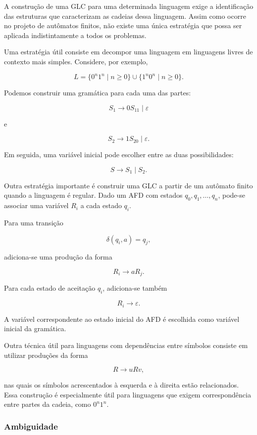 \documentclass[
  brazilian,
  letterpaper,
]{book}
\theoremstyle{plain}
\theoremstyle{definition}
\theoremstyle{remark}
\begin{document}
A construção de uma GLC para uma determinada linguagem exige a
identificação das estruturas que caracterizam as cadeias dessa
linguagem. Assim como ocorre no projeto de autômatos finitos, não existe
uma única estratégia que possa ser aplicada indistintamente a todos os
problemas.

Uma estratégia útil consiste em decompor uma linguagem em linguagens
livres de contexto mais simples. Considere, por exemplo,

\[
L=\{0^n1^n\mid n\geq0\}
\cup
\{1^n0^n\mid n\geq0\}.
\]

Podemos construir uma gramática para cada uma das partes:

\[
S_1\rightarrow0S_11\mid\varepsilon
\]

e

\[
S_2\rightarrow1S_20\mid\varepsilon.
\]

Em seguida, uma variável inicial pode escolher entre as duas
possibilidades:

\[
S\rightarrow S_1\mid S_2.
\]

Outra estratégia importante é construir uma GLC a partir de um autômato
finito quando a linguagem é regular. Dado um AFD com estados
\(q_0,q_1,\ldots,q_n\), pode-se associar uma variável \(R_i\) a cada
estado \(q_i\).

Para uma transição

\[
\delta(q_i,a)=q_j,
\]

adiciona-se uma produção da forma

\[
R_i\rightarrow aR_j.
\]

Para cada estado de aceitação \(q_i\), adiciona-se também

\[
R_i\rightarrow\varepsilon.
\]

A variável correspondente ao estado inicial do AFD é escolhida como
variável inicial da gramática.

Outra técnica útil para linguagens com dependências entre símbolos
consiste em utilizar produções da forma

\[
R\rightarrow uRv,
\]

nas quais os símbolos acrescentados à esquerda e à direita estão
relacionados. Essa construção é especialmente útil para linguagens que
exigem correspondência entre partes da cadeia, como \(0^n1^n\).

\subsubsection{Ambiguidade}\label{ambiguidade}
\end{document}
